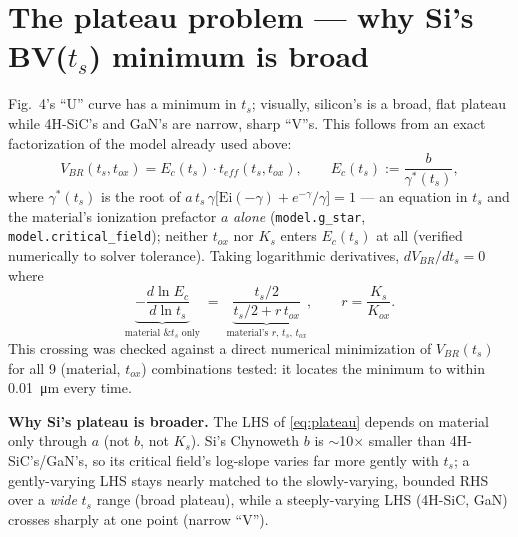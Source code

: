 \documentclass[11pt]{article}
\newcommand{\ts}{t_{s}}
\newcommand{\tox}{t_{ox}}
\newcommand{\Ei}{\mathrm{Ei}}
\begin{document}
\clearpage
\section{The plateau problem --- why Si's BV($t_s$) minimum is broad}

Fig.~4's ``U'' curve has a minimum in $\ts$; visually, silicon's is a broad,
flat plateau while 4H-SiC's and GaN's are narrow, sharp ``V''s. This follows
from an exact factorization of the model already used above:
\begin{equation}
V_{BR}(\ts,\tox) = E_c(\ts)\cdot t_{eff}(\ts,\tox), \qquad
E_c(\ts) := \frac{b}{\gamma^\ast(\ts)},
\end{equation}
where $\gamma^\ast(\ts)$ is the root of $a\,\ts\,\gamma\big[\Ei(-\gamma)+e^{-\gamma}/\gamma\big]=1$
--- an equation in $\ts$ and the material's ionization prefactor $a$
\emph{alone} (\texttt{model.g\_star}, \texttt{model.critical\_field}); neither
$\tox$ nor $K_s$ enters $E_c(\ts)$ at all (verified numerically to solver
tolerance). Taking logarithmic derivatives, $dV_{BR}/d\ts=0$ where
\begin{equation}
\underbrace{-\frac{d\ln E_c}{d\ln \ts}}_{\text{material \& }\ts\text{ only}}
\;=\;
\underbrace{\frac{\ts/2}{\ts/2 + r\,\tox}}_{\text{material's }r\text{, }\ts\text{, }\tox},
\qquad r = \frac{K_s}{K_{ox}}. \label{eq:plateau}
\end{equation}
This crossing was checked against a direct numerical minimization of
$V_{BR}(\ts)$ for all 9 (material, $\tox$) combinations tested: it locates the
minimum to within \SI{0.01}{\micro\meter} every time.

\textbf{Why Si's plateau is broader.} The LHS of \eqref{eq:plateau} depends on
material only through $a$ (not $b$, not $K_s$). Si's Chynoweth $b$ is
$\sim$10$\times$ smaller than 4H-SiC's/GaN's, so its critical field's
log-slope varies far more gently with $\ts$; a gently-varying LHS stays
nearly matched to the slowly-varying, bounded RHS over a \emph{wide} $\ts$
range (broad plateau), while a steeply-varying LHS (4H-SiC, GaN) crosses
sharply at one point (narrow ``V'').
\end{document}

